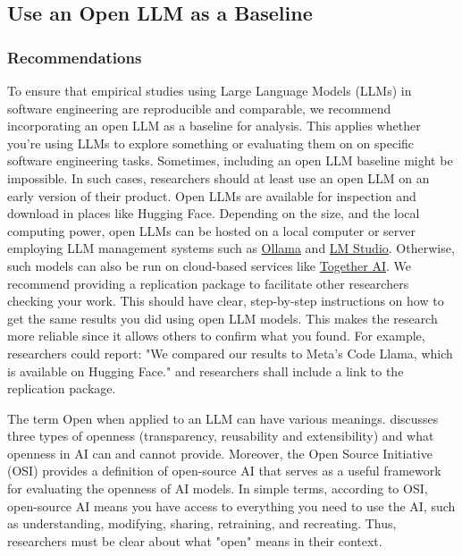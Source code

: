 



\subsection{Use an Open LLM as a Baseline}

\subsubsection{Recommendations}



To ensure that empirical studies using Large Language Models (LLMs) in software engineering are reproducible and comparable, 
we recommend incorporating an open LLM as a baseline for analysis. This applies whether you're using LLMs to explore something or evaluating them
on on specific software engineering tasks. 
Sometimes, including an open LLM baseline might be impossible. In such cases, researchers should at least use an open LLM on an early version of their product.
Open LLMs are available for inspection and download in places like Hugging Face. Depending on the size, and the local computing power, open LLMs can be hosted on a local computer or server employing LLM management systems such as \href{https://ollama.com/}{Ollama} and \href{https://lmstudio.ai/}{LM Studio}. Otherwise, such models can also be run on cloud-based services like \href{https://together.ai/}{Together AI}.
We recommend providing a replication package to facilitate other researchers checking your work. This should have clear, step-by-step instructions on how to get the same results you did using open LLM models. This makes the research more reliable since it allows others to confirm what you found.
For example, researchers could report: "We compared our results to Meta's Code Llama, which is available on Hugging Face." and researchers shall include a link to the replication package.

The term Open when applied to an LLM can have various meanings. \cite{widder2024open} discusses three types of openness (transparency, reusability 
and extensibility) and  what openness in AI can and cannot provide. Moreover, the Open Source Initiative (OSI) \cite{OSIAI2024} provides a definition of 
open-source AI that serves as a useful framework for evaluating the openness of AI models. In simple terms, according to OSI, open-source AI means 
you have access to everything you need to use the AI, such as understanding, modifying, sharing, retraining, and recreating. Thus, researchers must 
be clear about what "open" means in their context.

